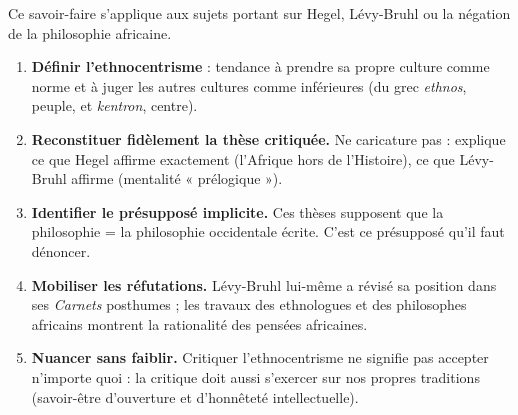 \documentclass[11pt]{article}
\begin{document}
\begin{methode}
Ce savoir-faire s'applique aux sujets portant sur Hegel, Lévy-Bruhl ou la négation de la philosophie africaine.

\begin{enumerate}
\item \textbf{Définir l'ethnocentrisme} : tendance à prendre sa propre culture comme norme et à juger les autres cultures comme inférieures (du grec \emph{ethnos}, peuple, et \emph{kentron}, centre).
\item \textbf{Reconstituer fidèlement la thèse critiquée.} Ne caricature pas : explique ce que Hegel affirme exactement (l'Afrique hors de l'Histoire), ce que Lévy-Bruhl affirme (mentalité « prélogique »).
\item \textbf{Identifier le présupposé implicite.} Ces thèses supposent que la philosophie = la philosophie occidentale écrite. C'est ce présupposé qu'il faut dénoncer.
\item \textbf{Mobiliser les réfutations.} Lévy-Bruhl lui-même a révisé sa position dans ses \emph{Carnets} posthumes ; les travaux des ethnologues et des philosophes africains montrent la rationalité des pensées africaines.
\item \textbf{Nuancer sans faiblir.} Critiquer l'ethnocentrisme ne signifie pas accepter n'importe quoi : la critique doit aussi s'exercer sur nos propres traditions (savoir-être d'ouverture et d'honnêteté intellectuelle).
\end{enumerate}
\end{methode}
\end{document}
